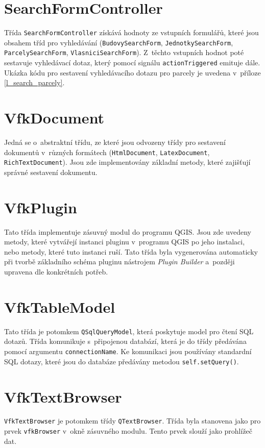 \documentclass[a4paper,12pt,oneside]{book}
\begin{document}
\section{SearchFormController}
Třída \texttt{SearchFormController} získává hodnoty ze vstupních
formulářů, které jsou obsahem tříd pro vyhledávání
(\texttt{BudovySearchForm}, \texttt{JednotkySearchForm},
\texttt{Par\-celySearchForm}, \texttt{VlasniciSearchForm}). Z~těchto
vstupních hodnot poté sestavuje vyhledávací dotaz, který pomocí
signálu \texttt{actionTriggered} emituje dále. Ukázka kódu pro
sestavení vyhledávacího dotazu pro parcely je uvedena v~příloze
\ref{l_search_parcely}.

\section{VfkDocument}
\label{l_vfkDocument}
Jedná se o~abstraktní třídu, ze které jsou odvozeny třídy pro
sestavení dokumentů v~různých formátech (\texttt{HtmlDocument},
\texttt{LatexDocument}, \texttt{RichTextDocument}). Jsou zde
implementovány základní metody, které zajišťují správné sestavení
dokumentu.

\section{VfkPlugin}
Tato třída implementuje zásuvný modul do programu QGIS. Jsou zde
uvedeny metody, které vytvářejí instanci pluginu v~programu QGIS po
jeho instalaci, nebo metody, které tuto instanci ruší. Tato třída byla
vygenerována automaticky při tvorbě základního schéma pluginu
nástrojem \textit{Plugin Builder} a~později upravena dle konkrétních
potřeb.

\section{VfkTableModel}
Tato třída je potomkem \texttt{QSqlQueryModel}, která poskytuje
model pro čtení SQL dotazů. Třída komunikuje s~připojenou databází,
která je do třídy předávána pomocí argumentu
\texttt{connectionName}. Ke komunikaci jsou používány standardní SQL
dotazy, které jsou do databáze předávány metodou
\texttt{self.setQuery()}.

\section{VfkTextBrowser}
\texttt{VfkTextBrowser} je potomkem třídy \texttt{QTextBrowser}. Třída
byla stanovena jako  pro prvek \texttt{vfkBrowser} v~okně
zásuvného modulu. Tento prvek slouží jako prohlížeč dat.
\end{document}
